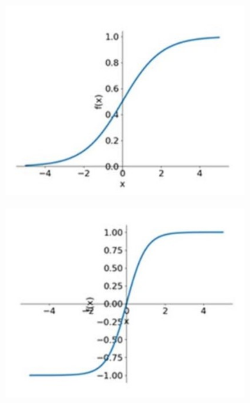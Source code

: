 \begin{figure}[h!]
	\centering
	
	\begin{subfigure}{0.22\textwidth}
		\includegraphics[width=\linewidth]{Images/DataMining/SigmoidFunction}
		\caption{}    %
		\label{subfig:Sigmoid}
	\end{subfigure}
	\hfill
	\begin{subfigure}{0.22\textwidth}
		\includegraphics[width=\linewidth]{Images/DataMining/TanhFunction}
		\caption{}    %

\end{subfigure}
\end{figure}
